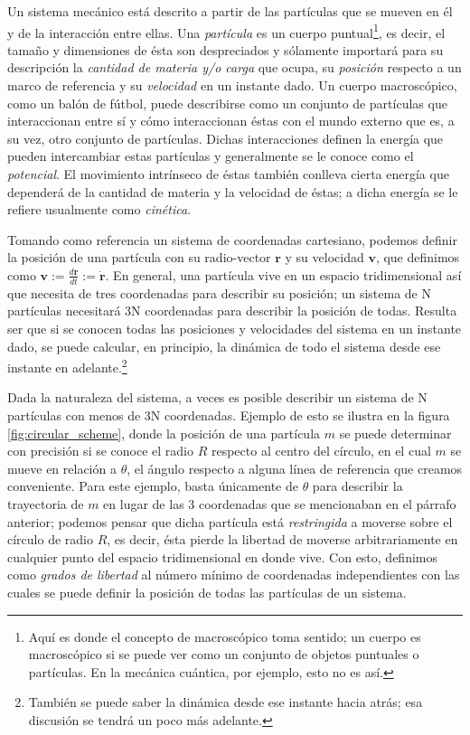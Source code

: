 Un sistema mecánico está descrito a partir de las partículas que se mueven en él y de la interacción entre ellas. Una \textit{partícula} es un cuerpo puntual\footnote{Aquí es donde el concepto de macroscópico toma sentido; un cuerpo es macroscópico si se puede ver como un conjunto de objetos puntuales o partículas. En la mecánica cuántica, por ejemplo, esto no es así.}, es decir, el tamaño y dimensiones de ésta son despreciados y sólamente importará para su descripción la \textit{cantidad de materia y/o carga} que ocupa, su \textit{posición} respecto a un marco de referencia y su \textit{velocidad} en un instante dado. Un cuerpo macroscópico, como un balón de fútbol, puede describirse como un conjunto de partículas que interaccionan entre sí y cómo interaccionan éstas con el mundo externo que es, a su vez, otro conjunto de partículas. Dichas interacciones definen la energía que pueden intercambiar estas partículas y generalmente se le conoce como el \textit{potencial}. El movimiento intrínseco de éstas también conlleva cierta energía que dependerá de la cantidad de materia y la velocidad de éstas; a dicha energía se le refiere usualmente como \textit{cinética}. 

Tomando como referencia un sistema de coordenadas cartesiano, podemos definir la posición de una partícula con su radio-vector $\mathbf{r}$ y su velocidad $\mathbf{v}$, que definimos como $\mathbf{v} := \frac{d \mathbf{r}}{dt} := \dot{\mathbf{r}}$. En general, una partícula vive en un espacio tridimensional así que necesita de tres coordenadas para describir su posición; un sistema de N partículas necesitará 3N coordenadas para describir la posición de todas. Resulta ser que si se conocen todas las posiciones y velocidades del sistema en un instante dado, se puede calcular, en principio, la dinámica de todo el sistema desde ese instante en adelante.\footnote{También se puede saber la dinámica desde ese instante hacia atrás; esa discusión se tendrá un poco más adelante.} 



Dada la naturaleza del sistema, a veces es posible describir un sistema de N partículas con menos de 3N coordenadas. Ejemplo de esto se ilustra en la figura \ref{fig:circular_scheme}, donde la posición de una partícula $m$ se puede determinar con precisión si se conoce el radio $R$ respecto al centro del círculo, en el cual $m$ se mueve en relación a $\theta$, el ángulo respecto a alguna línea de referencia que creamos conveniente. Para este ejemplo, basta únicamente de $\theta$ para describir la trayectoria de $m$ en lugar de las 3 coordenadas que se mencionaban en el párrafo anterior; podemos pensar que dicha partícula está \textit{restringida} a moverse sobre el círculo de radio $R$, es decir, ésta pierde la libertad de moverse arbitrariamente en cualquier punto del espacio tridimensional en donde vive. Con esto, definimos como \textit{grados de libertad} al número mínimo de coordenadas independientes con las cuales se puede definir la posición de todas las partículas de un sistema. 

